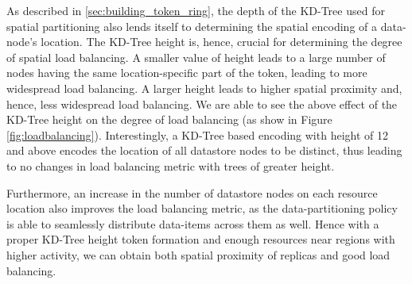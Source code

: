\par As described in \cref{sec:building_token_ring}, the depth of the KD-Tree used for spatial partitioning also lends itself to determining the spatial encoding of a data-node's location. The KD-Tree height is, hence, crucial for determining the degree of spatial load balancing. A smaller value of height leads to a large number of nodes having the same location-specific part of the token, leading to more widespread load balancing. A larger height leads to higher spatial proximity and, hence, less widespread load balancing. We are able to see the above effect of the KD-Tree height on the degree of load balancing (as show in Figure \ref{fig:loadbalancing}). Interestingly, a KD-Tree based encoding with height of 12 and above encodes the location of all datastore nodes to be distinct, thus leading to no changes in load balancing metric with trees of greater height. 
\par Furthermore, an increase in the number of datastore nodes on each resource location also improves the load balancing metric, as the data-partitioning policy is able to seamlessly distribute data-items across them as well.  Hence with a proper KD-Tree height token formation and enough resources near regions with higher activity, we can obtain both spatial proximity of replicas and good load balancing.

